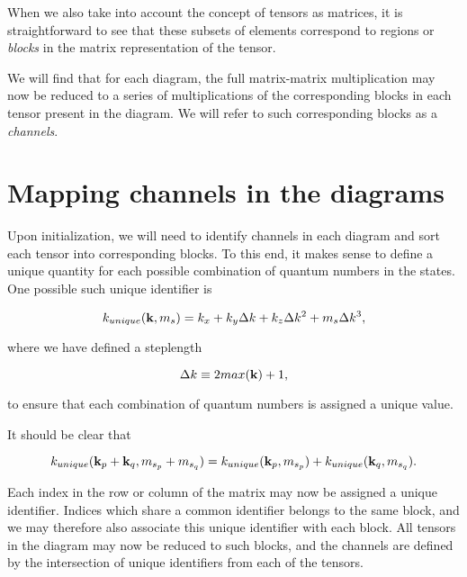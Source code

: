 When we also take into account the concept of tensors as matrices, it is straightforward to see that these subsets of elements correspond to regions or \emph{blocks} in the matrix representation of the tensor. 

We will find that for each diagram, the full matrix-matrix multiplication may now be reduced to a series of multiplications of the corresponding blocks in each tensor present in the diagram. We will refer to such corresponding blocks as a \emph{channels}. 


\section{Mapping channels in the diagrams}

Upon initialization, we will need to identify channels in each diagram and sort each tensor into corresponding blocks. To this end, it makes sense to define a unique quantity for each possible combination of quantum numbers in the states. One possible such unique identifier is 

\begin{equation}
k_{unique}(\bold{k}, m_s) = k_x + k_y\Delta k + k_z \Delta k ^2 + m_s\Delta k^3 ,
\end{equation}

where we have defined a steplength

\begin{equation}
\Delta k \equiv 2 max(\bold{k}) + 1,
\end{equation}

to ensure that each combination of quantum numbers is assigned a unique value. 

It should be clear that

\begin{equation}
k_{unique}(\bold{k}_p + \bold{k}_q, m_{s_p} + m_{s_q}) = k_{unique}(\bold{k}_p, m_{s_p})  + k_{unique}(\bold{k}_q, m_{s_q}) .
\end{equation}

Each index in the row or column of the matrix may now be assigned a unique identifier. Indices which share a common identifier belongs to the same block, and we may therefore also associate this unique identifier with each block. All tensors in the diagram may now be reduced to such blocks, and the channels are defined by the intersection of unique identifiers from each of the tensors. 


